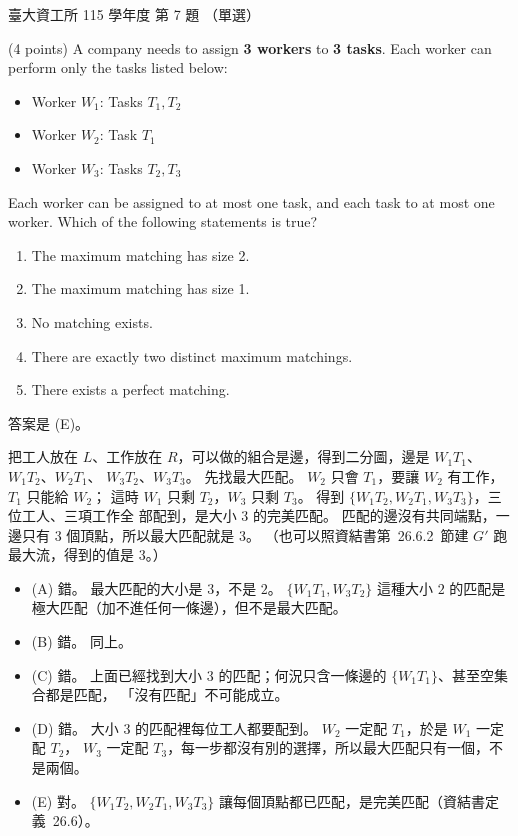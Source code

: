 \begin{pastexam}[label={px:ntu-115-dsa-07}]{臺大資工所 115 學年度 第 7 題}
（單選）

(4 points) A company needs to assign \textbf{3 workers} to \textbf{3 tasks}. Each worker can perform only the tasks listed below:
\begin{itemize}
\item Worker $W_1$: Tasks $T_1,T_2$
\item Worker $W_2$: Task $T_1$
\item Worker $W_3$: Tasks $T_2,T_3$
\end{itemize}
Each worker can be assigned to at most one task, and each task to at most one worker. Which of the following statements is true?
\begin{enumerate}[label=(\Alph*)]
\item The maximum matching has size 2.
\item The maximum matching has size 1.
\item No matching exists.
\item There are exactly two distinct maximum matchings.
\item There exists a perfect matching.
\end{enumerate}
\end{pastexam}

\begin{pastsoln}
答案是 (E)。

把工人放在 $L$、工作放在 $R$，可以做的組合是邊，得到二分圖，邊是 $W_1T_1$、$W_1T_2$、$W_2T_1$、
$W_3T_2$、$W_3T_3$。 先找最大匹配。 $W_2$ 只會 $T_1$，要讓 $W_2$ 有工作，$T_1$ 只能給 $W_2$；
這時 $W_1$ 只剩 $T_2$，$W_3$ 只剩 $T_3$。 得到 $\{W_1T_2, W_2T_1, W_3T_3\}$，三位工人、三項工作全
部配到，是大小 $3$ 的完美匹配。 匹配的邊沒有共同端點，一邊只有 $3$ 個頂點，所以最大匹配就是 $3$。
（也可以照資結書第~26.6.2~節建 $G'$ 跑最大流，得到的值是 $3$。）

\begin{itemize}
\item (A) 錯。 最大匹配的大小是 $3$，不是 $2$。 $\{W_1T_1, W_3T_2\}$ 這種大小 $2$ 的匹配是
極大匹配（加不進任何一條邊），但不是最大匹配。
\item (B) 錯。 同上。
\item (C) 錯。 上面已經找到大小 $3$ 的匹配；何況只含一條邊的 $\{W_1T_1\}$、甚至空集合都是匹配，
「沒有匹配」不可能成立。
\item (D) 錯。 大小 $3$ 的匹配裡每位工人都要配到。 $W_2$ 一定配 $T_1$，於是 $W_1$ 一定配 $T_2$，
$W_3$ 一定配 $T_3$，每一步都沒有別的選擇，所以最大匹配只有一個，不是兩個。
\item (E) 對。 $\{W_1T_2, W_2T_1, W_3T_3\}$ 讓每個頂點都已匹配，是完美匹配（資結書定義~26.6）。
\end{itemize}
\end{pastsoln}
